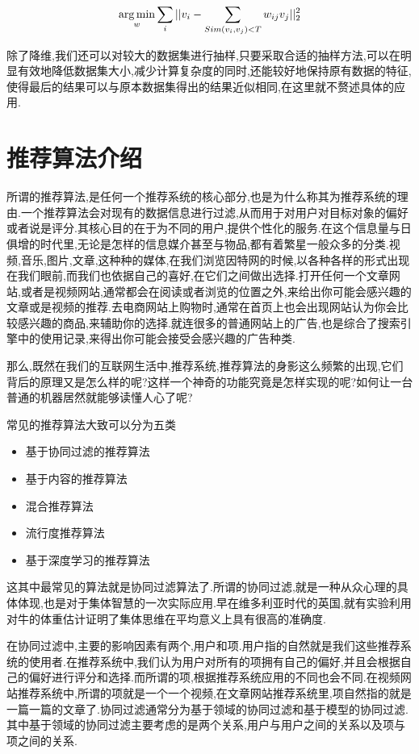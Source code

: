 \begin{equation}
	\operatorname*{arg\,min}_{w} \sum_i ||v_i-\sum_{Sim(v_i,v_j)<T}w_{ij}v_j||^2_2
\end{equation}

除了降维,我们还可以对较大的数据集进行抽样,只要采取合适的抽样方法,可以在明显有效地降低数据集大小,减少计算复杂度的同时,还能较好地保持原有数据的特征,使得最后的结果可以与原本数据集得出的结果近似相同,在这里就不赘述具体的应用.

\section{推荐算法介绍}
\label{sec:recomm}

所谓的推荐算法,是任何一个推荐系统的核心部分,也是为什么称其为推荐系统的理由.一个推荐算法会对现有的数据信息进行过滤,从而用于对用户对目标对象的偏好或者说是评分.其核心目的在于为不同的用户,提供个性化的服务.在这个信息量与日俱增的时代里,无论是怎样的信息媒介甚至与物品,都有着繁星一般众多的分类.视频,音乐,图片,文章,这种种的媒体,在我们浏览因特网的时候,以各种各样的形式出现在我们眼前,而我们也依据自己的喜好,在它们之间做出选择.打开任何一个文章网站,或者是视频网站,通常都会在阅读或者浏览的位置之外,来给出你可能会感兴趣的文章或是视频的推荐.去电商网站上购物时,通常在首页上也会出现网站认为你会比较感兴趣的商品,来辅助你的选择.就连很多的普通网站上的广告,也是综合了搜索引擎中的使用记录,来得出你可能会接受会感兴趣的广告种类.

那么,既然在我们的互联网生活中,推荐系统,推荐算法的身影这么频繁的出现,它们背后的原理又是怎么样的呢?这样一个神奇的功能究竟是怎样实现的呢?如何让一台普通的机器居然就能够读懂人心了呢?

常见的推荐算法大致可以分为五类

\begin{itemize}
	\item
		基于协同过滤的推荐算法
	\item
		基于内容的推荐算法
	\item
		混合推荐算法
	\item
		流行度推荐算法
	\item
		基于深度学习的推荐算法
\end{itemize}

这其中最常见的算法就是协同过滤算法了.所谓的协同过滤,就是一种从众心理的具体体现,也是对于集体智慧的一次实际应用.早在维多利亚时代的英国,就有实验利用对牛的体重估计证明了集体思维在平均意义上具有很高的准确度.

在协同过滤中,主要的影响因素有两个,用户和项.用户指的自然就是我们这些推荐系统的使用者.在推荐系统中,我们认为用户对所有的项拥有自己的偏好,并且会根据自己的偏好进行评分和选择.而所谓的项,根据推荐系统应用的不同也会不同.在视频网站推荐系统中,所谓的项就是一个一个视频,在文章网站推荐系统里,项自然指的就是一篇一篇的文章了.协同过滤通常分为基于领域的协同过滤和基于模型的协同过滤.其中基于领域的协同过滤主要考虑的是两个关系,用户与用户之间的关系以及项与项之间的关系.


